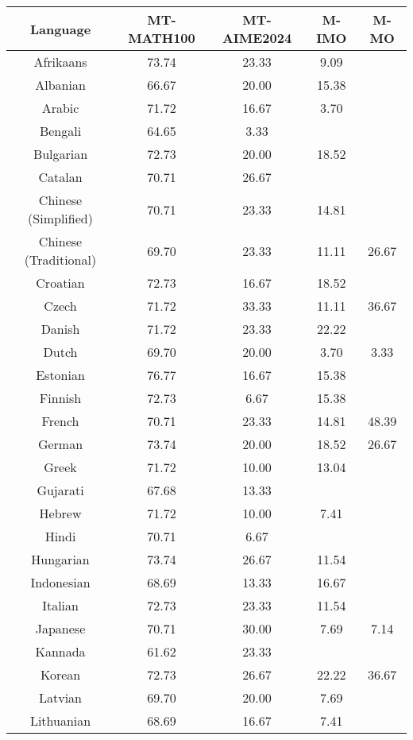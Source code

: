 \begin{table*}[]
\centering
\fontsize{9}{11} \selectfont
\begin{tabular}{c|cccc}
\toprule
\textbf{Language} & \textbf{MT-MATH100} & \textbf{MT-AIME2024} & \textbf{M-IMO} & \textbf{M-MO} \\ \midrule
Afrikaans & 73.74 & 23.33 & 9.09 &  \\
Albanian & 66.67 & 20.00 & 15.38 &  \\
Arabic & 71.72 & 16.67 & 3.70 &  \\
Bengali & 64.65 & 3.33 & \multicolumn{1}{l}{} &  \\
Bulgarian & 72.73 & 20.00 & 18.52 &  \\
Catalan & 70.71 & 26.67 & \multicolumn{1}{l}{} &  \\
Chinese (Simplified) & 70.71 & 23.33 & 14.81 &  \\
Chinese (Traditional) & 69.70 & 23.33 & 11.11 & \multirow{-2}{*}{26.67} \\
Croatian & 72.73 & 16.67 & 18.52 &  \\
Czech & 71.72 & 33.33 & 11.11 & 36.67 \\
Danish & 71.72 & 23.33 & 22.22 &  \\
Dutch & 69.70 & 20.00 & 3.70 & 3.33 \\
Estonian & 76.77 & 16.67 & 15.38 &  \\
Finnish & 72.73 & 6.67 & 15.38 &  \\
French & 70.71 & 23.33 & 14.81 & 48.39 \\
German & 73.74 & 20.00 & 18.52 & 26.67 \\
Greek & 71.72 & 10.00 & 13.04 &  \\
Gujarati & 67.68 & 13.33 & \multicolumn{1}{l}{} &  \\
Hebrew & 71.72 & 10.00 & 7.41 &  \\
Hindi & 70.71 & 6.67 & \multicolumn{1}{l}{} &  \\
Hungarian & 73.74 & 26.67 & 11.54 &  \\
Indonesian & 68.69 & 13.33 & 16.67 &  \\
Italian & 72.73 & 23.33 & 11.54 &  \\
Japanese & 70.71 & 30.00 & 7.69 & 7.14 \\
Kannada & 61.62 & 23.33 & \multicolumn{1}{l}{} &  \\
Korean & 72.73 & 26.67 & 22.22 & 36.67 \\
Latvian & 69.70 & 20.00 & 7.69 &  \\
Lithuanian & 68.69 & 16.67 & 7.41 &  \\

\end{tabular}
\end{table*}
